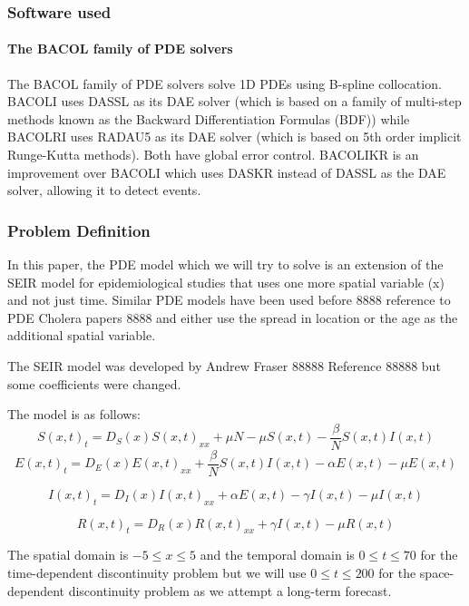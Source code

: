 \documentclass{article}
\begin{document}
\subsubsection{Software used}
\label{subsection:pde_software}
\paragraph{The BACOL family of PDE solvers}
The BACOL family of PDE solvers solve 1D PDEs using B-spline collocation. BACOLI uses DASSL as its DAE solver (which is based on a family of multi-step methods known as the Backward Differentiation Formulas (BDF)) while BACOLRI uses RADAU5 as its DAE solver (which is based on 5th order implicit Runge-Kutta methods). Both have global error control. BACOLIKR is an improvement over BACOLI which uses DASKR instead of DASSL as the DAE solver, allowing it to detect events.


\subsubsection{Problem Definition}
In this paper, the PDE model which we will try to solve is an extension of the SEIR model for epidemiological studies that uses one more spatial variable (x) and not just time. Similar PDE models have been used before 8888 reference to PDE Cholera papers 8888 and either use the spread in location or the age as the additional spatial variable.

The SEIR model was developed by Andrew Fraser 88888 Reference 88888 but some coefficients were changed.

The model is as follows:
\begin{equation}
S(x, t)_t = D_S(x)S(x, t)_{xx} + \mu N - \mu S(x, t) - \frac{\beta}{N}S(x, t)I(x, t)
\end{equation}
\begin{equation}
E(x, t)_t = D_E(x)E(x, t)_{xx} + \frac{\beta}{N}S(x, t)I(x, t) - \alpha E(x, t) - \mu E(x, t)
\end{equation}

\begin{equation}
I(x, t)_t = D_I(x)I(x, t)_{xx} + \alpha E(x, t) - \gamma I(x, t) - \mu I(x, t)
\end{equation}

\begin{equation}
R(x, t)_t = D_R(x)R(x, t)_{xx} + \gamma I(x, t) - \mu R(x, t)
\end{equation} 

The spatial domain is $-5 \leq x \leq 5$ and the temporal domain is $0 \leq t \leq 70$ for the time-dependent discontinuity problem but we will use $0 \leq t \leq 200$ for the space-dependent discontinuity problem as we attempt a long-term forecast.
\end{document}
